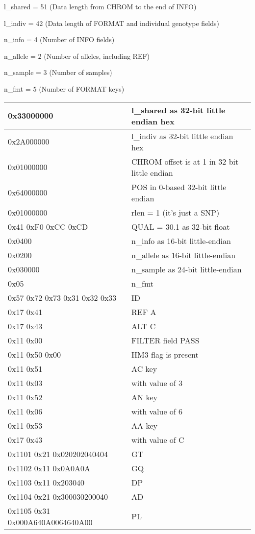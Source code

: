 \documentclass[8pt]{article}
\begin{document}
l\_shared = 51 (Data length from CHROM to the end of INFO)

l\_indiv = 42 (Data length of FORMAT and individual genotype fields)

n\_info = 4 (Number of INFO fields)

n\_allele = 2 (Number of alleles, including REF)

n\_sample = 3 (Number of samples)

n\_fmt = 5 (Number of FORMAT keys)

\vspace{0.3cm}
\begin{tabular}{|l| l|} \hline
0x33000000 & l\_shared as 32-bit little endian hex \\ \hline
0x2A000000 & l\_indiv as 32-bit little endian hex \\ \hline
0x01000000 & CHROM offset is at 1 in 32 bit little endian \\ \hline
0x64000000 & POS in 0-based 32-bit little endian \\ \hline
0x01000000 & rlen = 1 (it's just a SNP) \\ \hline
0x41 0xF0 0xCC 0xCD & QUAL = 30.1 as 32-bit float \\ \hline
0x0400     & n\_info as 16-bit little-endian \\ \hline
0x0200     & n\_allele as 16-bit little-endian \\ \hline
0x030000   & n\_sample as 24-bit little-endian \\ \hline
0x05       & n\_fmt \\ \hline
0x57 0x72 0x73 0x31 0x32 0x33 & ID \\ \hline
0x17 0x41 & REF A \\ \hline
0x17 0x43 & ALT C \\ \hline
0x11 0x00 & FILTER field PASS \\ \hline
0x11 0x50 0x00 & HM3 flag is present \\ \hline
0x11 0x51 & AC key \\ \hline
0x11 0x03 & with value of 3 \\ \hline
0x11 0x52 & AN key \\ \hline
0x11 0x06 & with value of 6 \\ \hline
0x11 0x53 & AA key \\ \hline
0x17 0x43 & with value of C \\ \hline
0x1101 0x21 0x020202040404 & GT \\ \hline
0x1102 0x11 0x0A0A0A & GQ \\ \hline
0x1103 0x11 0x203040 & DP \\ \hline
0x1104 0x21 0x300030200040 & AD \\ \hline
0x1105 0x31 0x000A640A0064640A00 & PL \\ \hline
\end{tabular}
\vspace{0.3cm}
\end{document}
